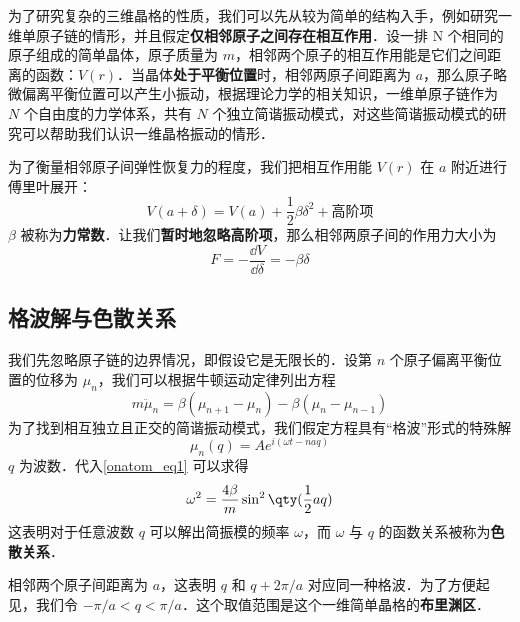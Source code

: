 
\begin{issues}
\issueTODO
\end{issues}


为了研究复杂的三维晶格的性质，我们可以先从较为简单的结构入手，例如研究一维单原子链的情形，并且假定\textbf{仅相邻原子之间存在相互作用}．设一排 N 个相同的原子组成的简单晶体，原子质量为 $m$，相邻两个原子的相互作用能是它们之间距离的函数：$V(r)$．当晶体\textbf{处于平衡位置}时，相邻两原子间距离为 $a$，那么原子略微偏离平衡位置可以产生小振动，根据理论力学的相关知识，一维单原子链作为 $N$ 个自由度的力学体系，共有 $N$ 个独立简谐振动模式，对这些简谐振动模式的研究可以帮助我们认识一维晶格振动的情形．

为了衡量相邻原子间弹性恢复力的程度，我们把相互作用能 $V(r)$ 在 $a$ 附近进行傅里叶展开：
\begin{equation}
V(a+\delta)=V(a)+\frac{1}{2}\beta \delta^2+\text{高阶项}
\end{equation}
$\beta$ 被称为\textbf{力常数}．让我们\textbf{暂时地忽略高阶项}，那么相邻两原子间的作用力大小为
\begin{equation}
F=-\frac{\dd V}{\dd \delta}=-\beta\delta
\end{equation}

\subsection{格波解与色散关系}
我们先忽略原子链的边界情况，即假设它是无限长的．设第 $n$ 个原子偏离平衡位置的位移为 $\mu_n$，我们可以根据牛顿运动定律列出方程
\begin{equation}\label{onatom_eq1}
m \ddot \mu_n = \beta(\mu_{n+1}-\mu_n)-\beta(\mu_n - \mu_{n-1})
\end{equation}
为了找到相互独立且正交的简谐振动模式，我们假定方程具有“格波”形式的特殊解
\begin{equation}\label{onatom_eq2}
\mu_{n}(q)=Ae^{i(\omega t-naq)}
\end{equation}
$q$ 为波数．代入\autoref{onatom_eq1} 可以求得
\begin{equation}\label{onatom_eq3}
\omega^2=\frac{4\beta}{m}\sin^2 \qty(\frac{1}{2}aq)
\end{equation}
这表明对于任意波数 $q$ 可以解出简振模的频率 $\omega$，而 $\omega$ 与 $q$ 的函数关系被称为\textbf{色散关系}．

相邻两个原子间距离为 $a$，这表明 $q$ 和 $q+2\pi/a$ 对应同一种格波．为了方便起见，我们令 $-\pi/a<q<\pi/a$．这个取值范围是这个一维简单晶格的\textbf{布里渊区}．

